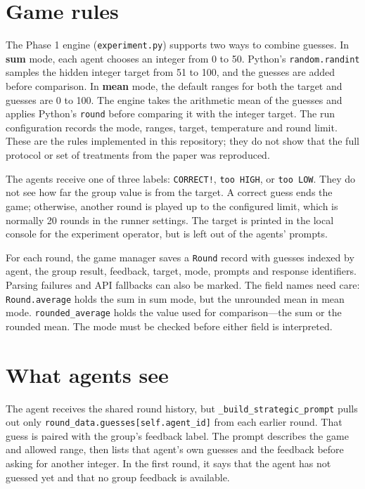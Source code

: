 \documentclass[12pt,a4paper,oneside]{report}
\begin{document}
\section{Game rules}
The Phase 1 engine (\texttt{experiment.py}) supports two ways to combine guesses. In \textbf{sum} mode, each agent chooses an integer from 0 to 50. Python’s \texttt{random.randint} samples the hidden integer target from 51 to 100, and the guesses are added before comparison. In \textbf{mean} mode, the default ranges for both the target and guesses are 0 to 100. The engine takes the arithmetic mean of the guesses and applies Python’s \texttt{round} before comparing it with the integer target. The run configuration records the mode, ranges, target, temperature and round limit. These are the rules implemented in this repository; they do not show that the full protocol or set of treatments from the paper was reproduced.

The agents receive one of three labels: \texttt{CORRECT!}, \texttt{too HIGH}, or \texttt{too LOW}. They do not see how far the group value is from the target. A correct guess ends the game; otherwise, another round is played up to the configured limit, which is normally 20 rounds in the runner settings. The target is printed in the local console for the experiment operator, but is left out of the agents’ prompts.

For each round, the game manager saves a \texttt{Round} record with guesses indexed by agent, the group result, feedback, target, mode, prompts and response identifiers. Parsing failures and API fallbacks can also be marked. The field names need care: \texttt{Round.average} holds the sum in sum mode, but the unrounded mean in mean mode. \texttt{rounded\allowbreak\_average} holds the value used for comparison—the sum or the rounded mean. The mode must be checked before either field is interpreted.

\section{What agents see}
The agent receives the shared round history, but \texttt{\allowbreak\_build\allowbreak\_strategic\allowbreak\_prompt} pulls out only \texttt{round\allowbreak\_data.guesses[self.agent\allowbreak\_id]} from each earlier round. That guess is paired with the group’s feedback label. The prompt describes the game and allowed range, then lists that agent’s own guesses and the feedback before asking for another integer. In the first round, it says that the agent has not guessed yet and that no group feedback is available.
\end{document}
